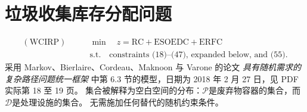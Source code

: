 \documentclass[10pt]{article}
\begin{document}
\section*{垃圾收集库存分配问题}
\begin{equation}
\begin{aligned}
(\mathrm{WCIRP})\qquad &\min\quad z=\mathrm{RC}+\mathrm{ESOEDC}+\mathrm{ERFC}\\
&\mathrm{s.t.}\quad\text{constraints (18)--(47), expanded below, and (55).}
\end{aligned}\tag{54}
\end{equation}
采用 Markov、Bierlaire、Cordeau、Maknoon 与 Varone 的论文 \emph{具有随机需求的复杂路径问题统一框架} 中第 6.3 节的模型，日期为 2018 年 2 月 27 日，见 PDF 实际第 18 至 19 页。 集合被解释为空白空间的分布：$\mathcal P$是废弃物容器的集合，而$\mathcal D$是处理设施的集合。 无需施加任何替代的随机约束条件。
\end{document}

